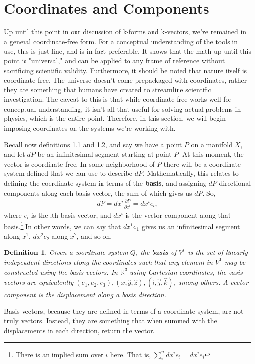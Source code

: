 \documentclass{book}
\newtheorem{defn}[equation]{Definition}
\begin{document}
\section{Coordinates and Components} 





Up until this point in our discussion of k-forms and k-vectors, we've remained in a general coordinate-free form. For a conceptual understanding of the tools in use, this is just fine, and is in fact preferable. It shows that the math up until this point is "universal," and can be applied to any frame of reference without sacrificing scientific validity. Furthermore, it should be noted that nature itself is coordinate-free. The universe doesn't come prepackaged with coordinates, rather they are something that humans have created to streamline scientific investigation. The caveat to this is that while coordinate-free works well for conceptual understanding, it isn't all that useful for solving actual problems in physics, which is the entire point. Therefore, in this section, we will begin imposing coordinates on the systems we're working with. 


Recall now definitions 1.1 and 1.2, and say we have a point $P$ on a manifold $X$, and let $dP$ be an infinitesimal segment starting at point $P$. At this moment, the vector is coordinate-free. In some neighborhood of $P$ there will be a coordinate system defined that we can use to describe $dP$. Mathematically, this relates to defining the coordinate system in terms of the \textbf{basis}, and assigning $dP$ directional components  along each basis vector, the sum of which gives us $dP$. So, \begin{gather}dP = dx^i \frac{\partial P}{\partial x^i} = dx^i e_i,\end{gather} where $e_i$ is the ith basis vector, and $dx^i$ is the vector component along that basis.\footnote{There is an implied sum over $i$ here. That is, $\sum_i^n dx^i e_i = dx^i e_i$} In other words, we can say that $dx^1e_1$ gives us an infinitesimal segment along $x^1$, $dx^2e_2$ along $x^2$, and so on. 


\begin{defn}
	Given a coordinate system $Q$, the \textbf{basis} of $V^1$ is the set of linearly independent directions along the coordinates such that any element in $V^1$ may be constructed using the basis vectors. In $\mathbb{R}^3$ using Cartesian coordinates, the basis vectors are equivalently $(e_1, e_2, e_3), (\hat{x}, \hat{y}, \hat{z}), (\hat{i}, \hat{j}, \hat{k})$, among others. A vector component is the displacement along a basis direction.
\end{defn}
Basis vectors, because they are defined in terms of a coordinate system, are not truly vectors. Instead, they are something that when summed with the displacements in each direction, return the vector. 
\end{document}
